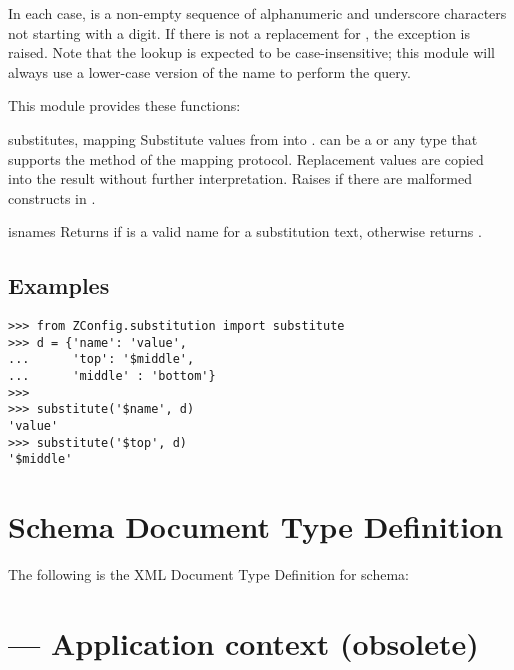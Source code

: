 \documentclass{howto}
\begin{document}
In each case,  is a non-empty sequence of alphanumeric and
underscore characters not starting with a digit.  If there is not a
replacement for , the exception
 is raised.
Note that the lookup is expected to be case-insensitive; this module
will always use a lower-case version of the name to perform the query.

This module provides these functions:

\begin{funcdesc}{substitute}{s, mapping}
  Substitute values from  into .  
  can be a  or any type that supports the 
  method of the mapping protocol.  Replacement
  values are copied into the result without further interpretation.
  Raises  if there are malformed
  constructs in .
\end{funcdesc}

\begin{funcdesc}{isname}{s}
  Returns  if  is a valid name for a substitution
  text, otherwise returns .
\end{funcdesc}


\subsection{Examples}

\begin{verbatim}
>>> from ZConfig.substitution import substitute
>>> d = {'name': 'value',
...      'top': '$middle',
...      'middle' : 'bottom'}
>>>
>>> substitute('$name', d)
'value'
>>> substitute('$top', d)
'$middle'
\end{verbatim}


\appendix
\section{Schema Document Type Definition \label{schema-dtd}}

The following is the XML Document Type Definition for 
schema:





\section{ --- Application context (obsolete)}
\end{document}
